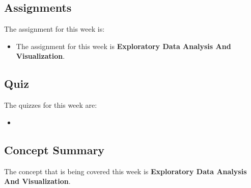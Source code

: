\subsection{Assignments}

The assignment for this week is:

\begin{itemize}
    \item The assignment for this week is \textbf{Exploratory Data Analysis And Visualization}. 
\end{itemize}

\subsection{Quiz}

The quizzes for this week are:

\begin{itemize}
    \item {} \textbullet {} 
\end{itemize}

\subsection{Concept Summary}

The concept that is being covered this week is \textbf{Exploratory Data Analysis And Visualization}.

